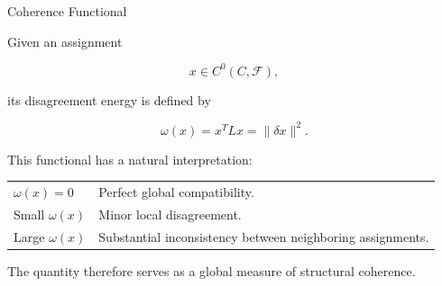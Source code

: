 \begin{mosbox}{Coherence Functional}

\BodyFont

Given an assignment

\[
x\in C^{0}(C,\mathcal F),
\]

its disagreement energy is defined by

\[
\boxed{
\omega(x)
=
x^{T}Lx
=
\|\delta x\|^{2}.
}
\]

This functional has a natural interpretation:

\begin{center}

\begin{tabular}{p{5cm}p{10cm}}

$\omega(x)=0$

&

Perfect global compatibility.

\\[4mm]

Small $\omega(x)$

&

Minor local disagreement.

\\[4mm]

Large $\omega(x)$

&

Substantial inconsistency between neighboring assignments.

\end{tabular}

\end{center}

The quantity therefore serves as a global measure of structural coherence.

\end{mosbox}


